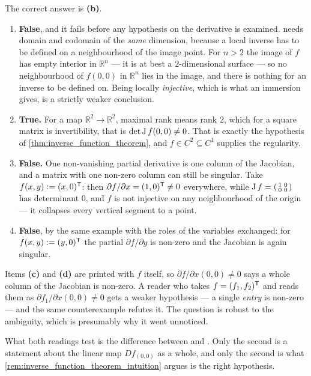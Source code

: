 \begin{exercisesolution}
\label{sol:kobel_ift_single_choice}
The correct answer is \textbf{(b)}.
\begin{enumerate}[label=\textbf{(\alph*)}]
  \item \textbf{False}, and it fails before any hypothesis on the derivative is examined.
     needs domain and codomain of the \emph{same} dimension,
    because a local inverse has to be defined on a neighbourhood of the image point. For
    $n > 2$ the image of $f$ has empty interior in $\mathbb{R}^n$ --- it is at best a
    $2$-dimensional surface --- so no neighbourhood of $f(0,0)$ in $\mathbb{R}^n$ lies in the
    image, and there is nothing for an inverse to be defined on. Being locally \emph{injective},
    which is what an immersion gives, is a strictly weaker conclusion.
  \item \textbf{True.} For a map $\mathbb{R}^2 \to \mathbb{R}^2$, maximal rank means rank $2$,
    which for a square matrix is invertibility, that is $\det\operatorname{J} f(0,0) \neq 0$. That is exactly
    the hypothesis of \cref{thm:inverse_function_theorem}, and $f \in C^2 \subseteq C^1$ supplies
    the regularity.
  \item \textbf{False.} One non-vanishing partial derivative is one column of the Jacobian, and a
    matrix with one non-zero column can still be singular. Take $f(x,y) := (x,0)^{\mathsf{T}}$: then
    $\partial f/\partial x = (1,0)^{\mathsf{T}} \neq 0$ everywhere, while
    $\operatorname{J} f = \left(\begin{smallmatrix}1&0\\0&0\end{smallmatrix}\right)$ has determinant $0$, and
    $f$ is not injective on any neighbourhood of the origin --- it collapses every vertical
    segment to a point.
  \item \textbf{False}, by the same example with the roles of the variables exchanged: for
    $f(x,y) := (y,0)^{\mathsf{T}}$ the partial $\partial f/\partial y$ is non-zero and the Jacobian is
    again singular.
\end{enumerate}
\begin{remark}
Items \textbf{(c)} and \textbf{(d)} are printed with $f$ itself, so
$\partial f/\partial x(0,0) \neq 0$ says a whole column of the Jacobian is non-zero. A reader who
takes $f = (f_1,f_2)^{\mathsf{T}}$ and reads them as $\partial f_1/\partial x(0,0) \neq 0$ gets a weaker
hypothesis --- a single \emph{entry} is non-zero --- and the same counterexample refutes it. The
question is robust to the ambiguity, which is presumably why it went unnoticed.

What both readings test is the difference between  and
. Only the second is a statement about the linear map $Df_{(0,0)}$
as a whole, and only the second is what \cref{rem:inverse_function_theorem_intuition} argues is the
right hypothesis.
\end{remark}
\end{exercisesolution}

